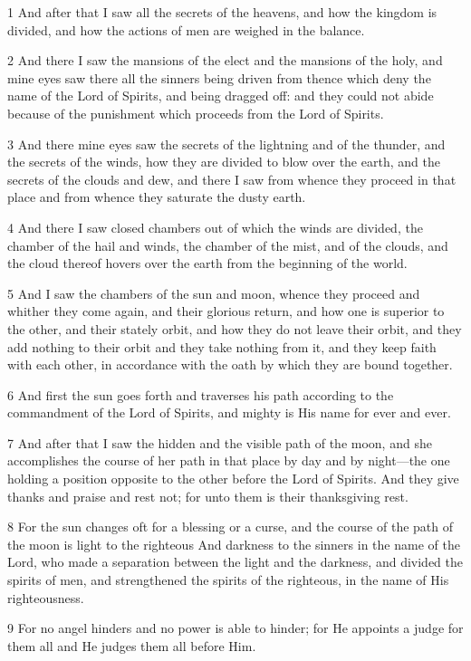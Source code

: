 \par 1 And after that I saw all the secrets of the heavens, and how the kingdom is divided, and how the actions of men are weighed in the balance.
\par 2 And there I saw the mansions of the elect and the mansions of the holy, and mine eyes saw there all the sinners being driven from thence which deny the name of the Lord of Spirits, and being dragged off: and they could not abide because of the punishment which proceeds from the Lord of Spirits.
\par 3 And there mine eyes saw the secrets of the lightning and of the thunder, and the secrets of the winds, how they are divided to blow over the earth, and the secrets of the clouds and dew, and there I saw from whence they proceed in that place and from whence they saturate the dusty earth.
\par 4 And there I saw closed chambers out of which the winds are divided, the chamber of the hail and winds, the chamber of the mist, and of the clouds, and the cloud thereof hovers over the earth from the beginning of the world.
\par 5 And I saw the chambers of the sun and moon, whence they proceed and whither they come again, and their glorious return, and how one is superior to the other, and their stately orbit, and how they do not leave their orbit, and they add nothing to their orbit and they take nothing from it, and they keep faith with each other, in accordance with the oath by which they are bound together.
\par 6 And first the sun goes forth and traverses his path according to the commandment of the Lord of Spirits, and mighty is His name for ever and ever.
\par 7 And after that I saw the hidden and the visible path of the moon, and she accomplishes the course of her path in that place by day and by night—the one holding a position opposite to the other before the Lord of Spirits. And they give thanks and praise and rest not; for unto them is their thanksgiving rest.
\par 8 For the sun changes oft for a blessing or a curse, and the course of the path of the moon is light to the righteous And darkness to the sinners in the name of the Lord, who made a separation between the light and the darkness, and divided the spirits of men, and strengthened the spirits of the righteous, in the name of His righteousness.
\par 9 For no angel hinders and no power is able to hinder; for He appoints a judge for them all and He judges them all before Him.

